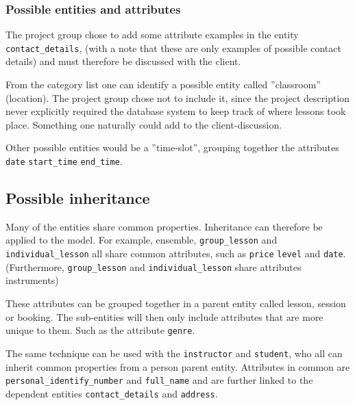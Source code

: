\documentclass[a4paper]{scrartcl}
\begin{document}
\subsubsection*{Possible entities and attributes}
The project group chose to add some attribute examples in the entity 
\verb|contact_details|,
(with a note that these
are only examples of possible contact details) and 
must therefore be discussed 
with the client. 

From the category list one can identify a possible entity
called ''classroom'' (location).
The project group chose not to include it, 
since the project description never explicitly required 
the database system to keep track of where lessons took place.
Something one naturally could add to the client-discussion. 

Other possible entities would be a ''time-slot'', grouping 
together the attributes
\verb|date|
\verb|start_time|
\verb|end_time|.

\subsection*{Possible inheritance}
Many of the entities share common properties. 
Inheritance can therefore be applied to the model. 
For example, 
ensemble, 
\verb|group_lesson| and 
\verb|individual_lesson| 
all share common attributes, such as 
\verb|price|
\verb|level| and 
\verb|date|. 
(Furthermore, 
\verb|group_lesson| and 
\verb|individual_lesson| share attributes instruments)

These attributes can be grouped together
in a parent entity called lesson, session or booking. 
The sub-entities will then only include attributes that are more
unique to them. 
Such as the attribute
\verb|genre|.

The same technique can be used with the 
\verb|instructor| and 
\verb|student|,
who all can inherit common properties from a 
person 
parent entity. 
Attributes in common are 
\verb|personal_identify_number| and 
\verb|full_name| 
and are further linked to the dependent entities 
\verb|contact_details|
and 
\verb|address|.


\end{document}
